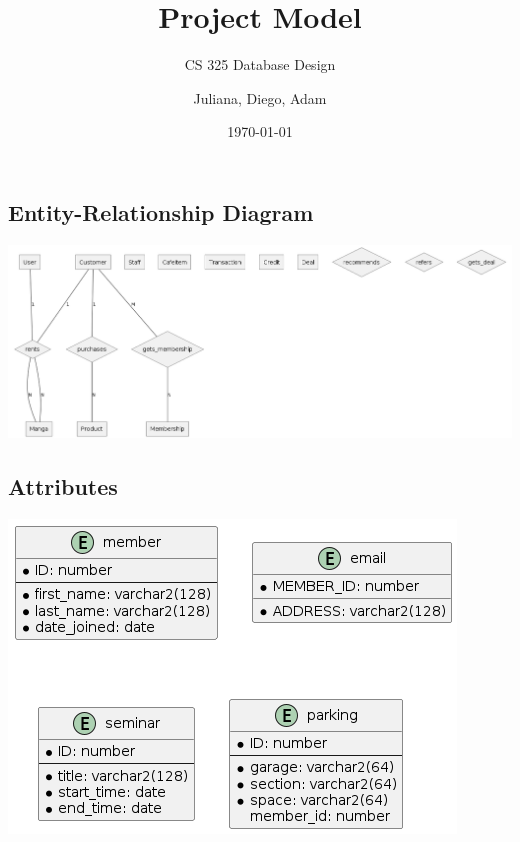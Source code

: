 \documentclass{scrartcl}
\title{Project Model}
\subtitle{CS 325 Database Design}
\author{Juliana, Diego, Adam}
\date{\today}
\begin{document}
\maketitle

\subsection*{Entity-Relationship Diagram}
\includegraphics[scale=0.5]{er}
\subsection*{Attributes}
\includegraphics[scale=0.5]{db}
\end{document}
